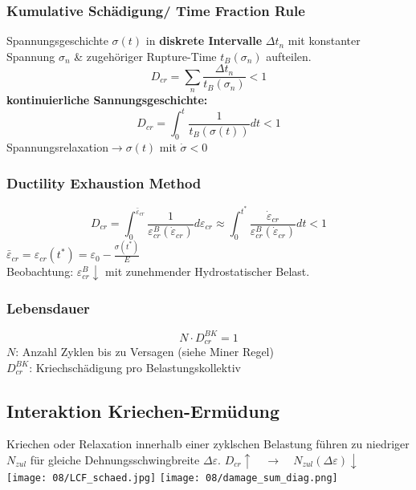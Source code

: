         \subsubsection{Kumulative Schädigung/ Time Fraction Rule}
            Spannungsgeschichte $\sigma(t)$ in \textbf{diskrete Intervalle} $\Delta t_n$ mit konstanter Spannung $\sigma_n$ \& zugehöriger Rupture-Time $t_B(\sigma_n)$ aufteilen.
            \[D_{cr}=\sum_n\frac{\Delta t_{n}}{t_B(\sigma_n)} < 1\]
            \textbf{kontinuierliche Sannungsgeschichte:}
            \[D_{cr}=\int_0^t\frac{1}{t_B(\sigma(t))}dt < 1\]
            Spannungsrelaxation$\rightarrow \sigma(t)$ mit $\dot{\sigma}<0$
            
        \subsubsection{Ductility Exhaustion Method}
            \[D_{cr}=\int_0^{\bar{\varepsilon}_{cr}}\frac{1}{\varepsilon_{cr}^B(\dot{\varepsilon}_{cr})}d\varepsilon_{cr} \approx \int_0^{t^{\ast}}\frac{\dot{\varepsilon}_{cr}}{\varepsilon_{cr}^B(\dot{\varepsilon}_{cr})}dt< 1\]
            $\bar{\varepsilon}_{cr}=\varepsilon_{cr}(t^{*})=\varepsilon_0-\frac{\sigma(t^{*})}{E}$
            \\Beobachtung: $\varepsilon_{cr}^{B}\downarrow$ mit zunehmender Hydrostatischer Belast.
        \subsubsection{Lebensdauer}
            \[N\cdot D_{cr}^{BK} = 1\]
            $N$: Anzahl Zyklen bis zu Versagen (siehe Miner Regel)
            \\$D_{cr}^{BK}$: Kriechschädigung pro Belastungskollektiv
\vfill\null\columnbreak
    \subsection{Interaktion Kriechen-Ermüdung}
        Kriechen oder Relaxation innerhalb einer zyklschen Belastung führen zu niedriger $N_{zul}$ für gleiche Dehnungsschwingbreite $\Delta\varepsilon$. $D_{cr}\uparrow \quad\rightarrow\quad N_{zul}(\Delta\varepsilon)\downarrow$\\
            \texttt{[image: 08/LCF\_schaed.jpg]}
            \texttt{[image: 08/damage\_sum\_diag.png]}
        
